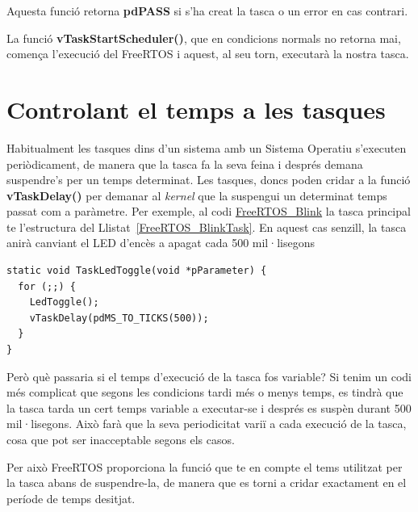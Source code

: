 Aquesta funció retorna {\bf pdPASS} si s'ha creat la tasca o un error en cas contrari.

La funció {\bf vTaskStartScheduler()}, que en condicions normals no retorna mai, comença l'execució del FreeRTOS i aquest, al seu torn, executarà la nostra tasca.





\chapter{Controlant el temps a les tasques}
Habitualment les tasques dins d'un sistema amb un Sistema Operatiu s'executen periòdicament, de manera que la tasca fa la seva feina i després demana suspendre's per un temps determinat. Les tasques, doncs poden cridar a la funció {\bf vTaskDelay()} per demanar al {\em kernel} que la suspengui un determinat temps passat com a paràmetre. Per exemple, al codi \href{https://github.com/mariusmm/cursembedded/tree/master/Simplicity/FreeRTOS_Blink}{FreeRTOS\_Blink} la tasca principal te l'estructura del Llistat~\ref{FreeRTOS_BlinkTask}. En aquest cas senzill, la tasca anirà canviant el LED d'encès a apagat cada 500 mil·lisegons

\begin{lstlisting}[style=customc, label=FreeRTOS_BlinkTask, caption=Tasca de l'exemple FreeRTOS\_BlinkTask]
static void TaskLedToggle(void *pParameter) {
  for (;;) {
    LedToggle();
    vTaskDelay(pdMS_TO_TICKS(500));
  }
}
\end{lstlisting}

Però què passaria si el temps d'execució de la tasca fos variable? Si tenim un codi més complicat que segons les condicions tardi més o menys temps, es tindrà que la tasca tarda un cert temps variable a executar-se i després es suspèn durant 500 mil·lisegons. Això farà que la seva periodicitat variï a cada execució de la tasca, cosa que pot ser inacceptable segons els casos.

Per això FreeRTOS proporciona la funció  que te en compte el tems utilitzat per la tasca abans de suspendre-la, de manera que es torni a cridar exactament en el període de temps desitjat.

